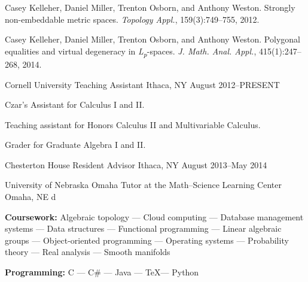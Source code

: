 \documentclass[11pt, letterpaper]{awesome-cv}
\begin{document}
\begin{cvparagraph}

Casey Kelleher, Daniel Miller, Trenton Osborn, and Anthony Weston. Strongly non-embeddable metric spaces. \emph{Topology Appl.}, 159(3):749--755, 2012. 

Casey Kelleher, Daniel Miller, Trenton Osborn, and Anthony Weston. Polygonal equalities and virtual degeneracy in \emph{L\textsubscript{p}}-spaces. \emph{J. Math. Anal. Appl.}, 415(1):247--268, 2014. 
\end{cvparagraph}






\begin{cventries}

\cventry
	{Cornell University}
	{Teaching Assistant}
	{Ithaca, NY}
	{August 2012--PRESENT}
	{
		\begin{cvitems}
			\item{Czar's Assistant for Calculus I and II.}
			\item{Teaching assistant for Honors Calculus II and Multivariable Calculus.}
			\item{Grader for Graduate Algebra I and II.}
		\end{cvitems}
	}

\cventry
	{Chesterton House}
	{Resident Advisor}
	{Ithaca, NY}
	{August 2013--May 2014}
	{}

\cventry
	{University of Nebraska Omaha}
	{Tutor at the Math--Science Learning Center}
	{Omaha, NE}
	{d}
	{}
	
\end{cventries}





\begin{cvparagraph}

\textbf{Coursework:} Algebraic topology --- Cloud computing --- Database management systems --- Data structures --- Functional programming --- Linear algebraic groups --- Object-oriented programming --- Operating systems --- Probability theory --- Real analysis --- Smooth manifolds

\textbf{Programming:} C --- C\# --- Java --- \TeX --- Python
\end{cvparagraph}
\end{document}
